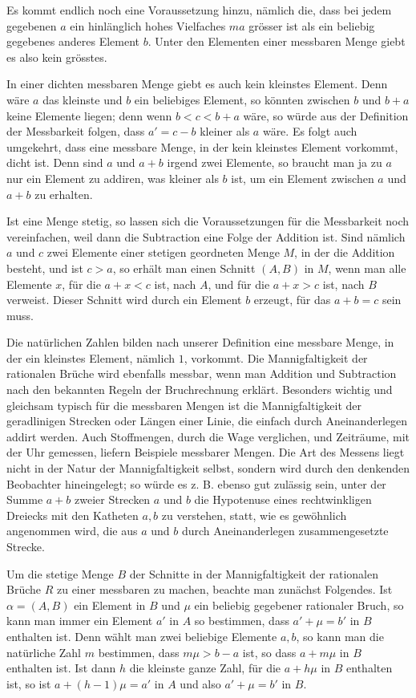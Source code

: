 \documentclass[11pt]{article}
\begin{document}
Es kommt endlich noch eine Voraussetzung hinzu, nämlich die, dass bei jedem gegebenen $a$ ein hinlänglich hohes Vielfaches $ma$ grösser ist als ein beliebig gegebenes anderes Element $b$. Unter den Elementen einer messbaren Menge giebt es also kein grösstes.

In einer dichten messbaren Menge giebt es auch kein kleinstes Element. Denn wäre $a$ das kleinste und $b$ ein beliebiges Element, so könnten zwischen $b$ und $b+a$ keine Elemente liegen; denn wenn $b<c<b+a$ wäre, so würde aus der Definition der Messbarkeit folgen, dass $a'=c-b$ kleiner als $a$ wäre. Es folgt auch umgekehrt, dass eine messbare Menge, in der kein kleinstes Element vorkommt, dicht ist. Denn sind $a$ und $a+b$ irgend zwei Elemente, so braucht man ja zu $a$ nur ein Element zu addiren, was kleiner als $b$ ist, um ein Element zwischen $a$ und $a+b$ zu erhalten.

Ist eine Menge stetig, so lassen sich die Voraussetzungen für die Messbarkeit noch vereinfachen, weil dann die Subtraction eine Folge der Addition ist. Sind nämlich $a$ und $c$ zwei Elemente einer stetigen geordneten Menge $M$, in der die Addition besteht, und ist $c>a$, so erhält man einen Schnitt $(A,B)$ in $M$, wenn man alle Elemente $x$, für die $a+x<c$ ist, nach $A$, und für die $a+x>c$ ist, nach $B$ verweist. Dieser Schnitt wird durch ein Element $b$ erzeugt, für das $a+b=c$ sein muss.

Die natürlichen Zahlen bilden nach unserer Definition eine messbare Menge, in der ein kleinstes Element, nämlich $1$, vorkommt. Die Mannigfaltigkeit der rationalen Brüche wird ebenfalls messbar, wenn man Addition und Subtraction nach den bekannten Regeln der Bruchrechnung erklärt. Besonders wichtig und gleichsam typisch für die messbaren Mengen ist die Mannigfaltigkeit der geradlinigen Strecken oder Längen einer Linie, die einfach durch Aneinanderlegen addirt werden. Auch Stoffmengen, durch die Wage verglichen, und Zeiträume, mit der Uhr gemessen, liefern Beispiele messbarer Mengen. Die Art des Messens liegt nicht in der Natur der Mannigfaltigkeit selbst, sondern wird durch den denkenden Beobachter hineingelegt; so würde es z. B. ebenso gut zulässig sein, unter der Summe $a+b$ zweier Strecken $a$ und $b$ die Hypotenuse eines rechtwinkligen Dreiecks mit den Katheten $a,b$ zu verstehen, statt, wie es gewöhnlich angenommen wird, die aus $a$ und $b$ durch Aneinanderlegen zusammengesetzte Strecke.

Um die stetige Menge $B$ der Schnitte in der Mannigfaltigkeit der rationalen Brüche $R$ zu einer messbaren zu machen, beachte man zunächst Folgendes. Ist $\alpha=(A,B)$ ein Element in $B$ und $\mu$ ein beliebig gegebener rationaler Bruch, so kann man immer ein Element $a'$ in $A$ so bestimmen, dass $a'+\mu=b'$ in $B$ enthalten ist. Denn wählt man zwei beliebige Elemente $a,b$, so kann man die natürliche Zahl $m$ bestimmen, dass $m\mu>b-a$ ist, so dass $a+m\mu$ in $B$ enthalten ist. Ist dann $h$ die kleinste ganze Zahl, für die $a+h\mu$ in $B$ enthalten ist, so ist $a+(h-1)\mu=a'$ in $A$ und also $a'+\mu=b'$ in $B$.
\end{document}
